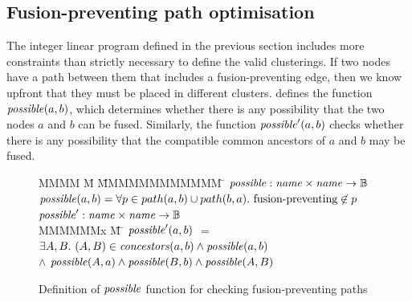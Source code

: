 \subsection{Fusion-preventing path optimisation}
\label{clustering:s:OptimisedConstraints}
The integer linear program defined in the previous section includes more constraints than strictly necessary to define the valid clusterings.
If two nodes have a path between them that includes a fusion-preventing edge, then we know upfront that they must be placed in different clusters.
 defines the function $\mathit{possible}(a,b)$, which determines whether there is any possibility that the two nodes $a$ and $b$ can be fused.
Similarly, the function $\mathit{possible}'(a, b)$ checks whether there is any possibility that the compatible common ancestors of $a$ and $b$ may be fused.

\begin{figure}
\begin{tabbing}
MMMM \= M \=     \= MMMMMMMMMMMM    \=  \kill
$\mathit{possible} : \mathit{name} \times \mathit{name} \to \mathbb{B}$ \\
$\mathit{possible}(a,b) = \forall p \in path(a,b) \cup path(b,a).\ \mbox{fusion-preventing} \not\in p$
\\[1ex]
$\mathit{possible}' : \mathit{name} \times \mathit{name} \to \mathbb{B}$ \\
MMMMMMx        \= M    \= \kill
$\mathit{possible}'(a,b)$ 
        \> $=$   \>$\exists A, B.\ (A,B) \in \mathit{concestors}(a,b) \wedge \mathit{possible}(a,b)$ \\
        \> $\wedge$ \> $\mathit{possible}(A,a) \wedge \mathit{possible}(B,b) \wedge \mathit{possible}(A,B)$
\end{tabbing}
\caption{Definition of $\mathit{possible}$ function for checking fusion-preventing paths}
\label{fig:clustering:possible}
\end{figure}

